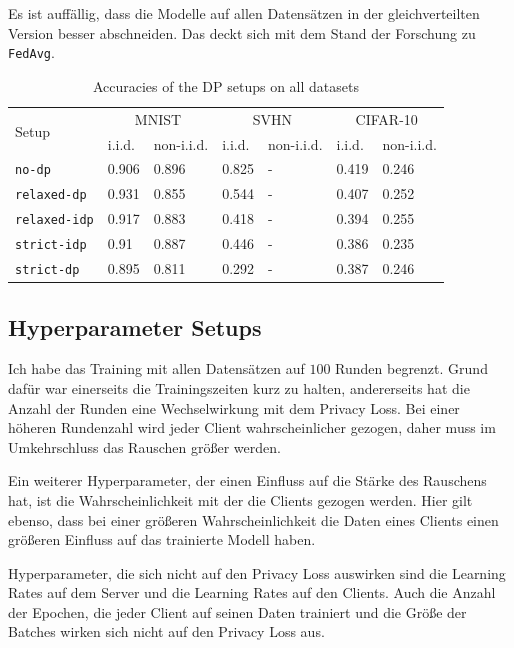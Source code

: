 Es ist auffällig, dass die Modelle auf allen Datensätzen in der gleichverteilten Version besser abschneiden. Das deckt sich mit dem Stand der Forschung zu \texttt{FedAvg}.

\begin{table}
	\centering
	\begin{tabular}{|l|p{4em}|p{4em}|p{4em}|p{4em}|p{4em}|p{4em}|}
		\hline
		\multirow{2}{4em}{Setup} & \multicolumn{2}{c|}{MNIST} & \multicolumn{2}{c|}{SVHN} & \multicolumn{2}{c|}{CIFAR-10} \\
		\cline{2-7}
		& i.i.d. & non-i.i.d. & i.i.d. & non-i.i.d. & i.i.d. & non-i.i.d. \\
		\hline
		\texttt{no-dp} & 0.906 & 0.896 & 0.825 & - & 0.419 & 0.246 \\
		\texttt{relaxed-dp} & 0.931 & 0.855 & 0.544 & - & 0.407 & 0.252 \\
		\texttt{relaxed-idp} & 0.917 & 0.883 & 0.418 & - & 0.394 & 0.255 \\
		\texttt{strict-idp} & 0.91 & 0.887 & 0.446 & - & 0.386 & 0.235 \\
		\texttt{strict-dp} & 0.895 & 0.811 & 0.292 & - & 0.387 & 0.246 \\
		\hline
	\end{tabular}
	\caption{Accuracies of the DP setups on all datasets}
	\label{tab:all-fed-results}
\end{table}

\subsection{Hyperparameter Setups}
Ich habe das Training mit allen Datensätzen auf $100$ Runden begrenzt. Grund dafür war einerseits die Trainingszeiten kurz zu halten, andererseits hat die Anzahl der Runden eine Wechselwirkung mit dem Privacy Loss. Bei einer höheren Rundenzahl wird jeder Client wahrscheinlicher gezogen, daher muss im Umkehrschluss das Rauschen größer werden. 

Ein weiterer Hyperparameter, der einen Einfluss auf die Stärke des Rauschens hat, ist die Wahrscheinlichkeit mit der die Clients gezogen werden. Hier gilt ebenso, dass bei einer größeren Wahrscheinlichkeit die Daten eines Clients einen größeren Einfluss auf das trainierte Modell haben.

Hyperparameter, die sich nicht auf den Privacy Loss auswirken sind die Learning Rates auf dem Server und die Learning Rates auf den Clients. Auch die Anzahl der Epochen, die jeder Client auf seinen Daten trainiert und die Größe der Batches wirken sich nicht auf den Privacy Loss aus.


